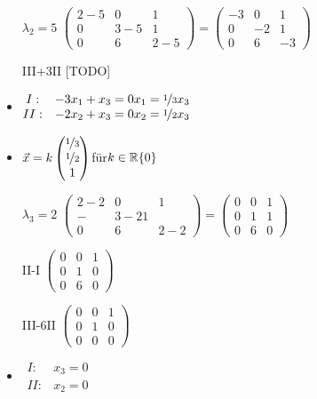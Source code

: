 \documentclass{article}
\newcommand{\R}{\mathbb{R}}
\begin{document}
\begin{itemize}
\begin{itemize}
\begin{itemize}
				\item[$\lambda_2=5$]{$\begin{pmatrix} 2-5 & 0 & 1 \\ 0 & 3-5 & 1 \\ 0 & 6 &2-5 \end{pmatrix}=\begin{pmatrix} -3 & 0 & 1 \\ 0 & -2 & 1 \\ 0 & 6 & -3 \end{pmatrix}$}
				\item[III+3II]{[TODO]}
				\item{$\begin{matrix} I: & -3x_1+x_3=0 \\ II: & -2x_2+x_3=0\end{matrix}\begin{matrix} x_1=\nicefrac{1}{3}x_3 \\ x_2=\nicefrac{1}{2}x_3 \end{matrix}$}
				\item{$\vec{x}=k \begin{pmatrix} \nicefrac{1}{3} \\ \nicefrac{1}{2} \\ 1 \end{pmatrix}$für$k\in\R\\\{0\}$}
				\item[$\lambda_3=2$]{$\begin{pmatrix} 2-2 & 0 & 1 \\ - & 3-2 1 \\ 0 & 6 & 2-2 \end{pmatrix}=\begin{pmatrix} 0 & 0 & 1 \\ 0 & 1 & 1 \\ 0 & 6 & 0 \end{pmatrix}$}
				\item[II-I]{$\begin{pmatrix} 0 & 0 & 1 \\ 0 & 1 & 0 \\ 0 & 6 & 0 \end{pmatrix}$}
				\item[III-6II]{$\begin{pmatrix} 0 & 0 & 1 \\ 0 & 1 & 0 \\ 0 & 0 & 0 \end{pmatrix}$}
				\item{$\begin{matrix} I: & x_3=0 \\ II: & x_2=0 \end{matrix}$}

\end{itemize}
\end{itemize}
\end{itemize}
\end{document}
